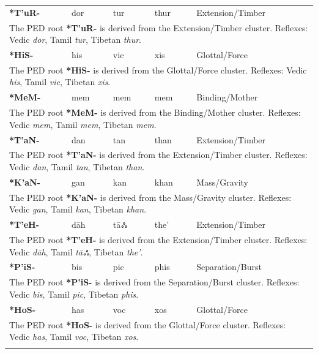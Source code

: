 \begin{longtable}{p{} p{} p{} p{} p{}}
\textbf{*T'uR-} & dor & tur & thur & Extension/Timber \\ 
\multicolumn{5}{p{\textwidth}}{\small The PED root \textbf{*T'uR-} is derived from the Extension/Timber cluster. Reflexes: Vedic \textit{dor}, Tamil \textit{tur}, Tibetan \textit{thur}. } \\ \addlinespace 
\textbf{*HiS-} & his & vic & xis & Glottal/Force \\ 
\multicolumn{5}{p{\textwidth}}{\small The PED root \textbf{*HiS-} is derived from the Glottal/Force cluster. Reflexes: Vedic \textit{his}, Tamil \textit{vic}, Tibetan \textit{xis}. } \\ \addlinespace 
\textbf{*MeM-} & mem & mem & mem & Binding/Mother \\ 
\multicolumn{5}{p{\textwidth}}{\small The PED root \textbf{*MeM-} is derived from the Binding/Mother cluster. Reflexes: Vedic \textit{mem}, Tamil \textit{mem}, Tibetan \textit{mem}. } \\ \addlinespace 
\textbf{*T'aN-} & dan & tan & than & Extension/Timber \\ 
\multicolumn{5}{p{\textwidth}}{\small The PED root \textbf{*T'aN-} is derived from the Extension/Timber cluster. Reflexes: Vedic \textit{dan}, Tamil \textit{tan}, Tibetan \textit{than}. } \\ \addlinespace 
\textbf{*K'aN-} & gan & kan & khan & Mass/Gravity \\ 
\multicolumn{5}{p{\textwidth}}{\small The PED root \textbf{*K'aN-} is derived from the Mass/Gravity cluster. Reflexes: Vedic \textit{gan}, Tamil \textit{kan}, Tibetan \textit{khan}. } \\ \addlinespace 
\textbf{*T'eH-} & dāh & tāஃ & the' & Extension/Timber \\ 
\multicolumn{5}{p{\textwidth}}{\small The PED root \textbf{*T'eH-} is derived from the Extension/Timber cluster. Reflexes: Vedic \textit{dāh}, Tamil \textit{tāஃ}, Tibetan \textit{the'}. } \\ \addlinespace 
\textbf{*P'iS-} & bis & pic & phis & Separation/Burst \\ 
\multicolumn{5}{p{\textwidth}}{\small The PED root \textbf{*P'iS-} is derived from the Separation/Burst cluster. Reflexes: Vedic \textit{bis}, Tamil \textit{pic}, Tibetan \textit{phis}. } \\ \addlinespace 
\textbf{*HoS-} & has & voc & xos & Glottal/Force \\ 
\multicolumn{5}{p{\textwidth}}{\small The PED root \textbf{*HoS-} is derived from the Glottal/Force cluster. Reflexes: Vedic \textit{has}, Tamil \textit{voc}, Tibetan \textit{xos}. } \\ \addlinespace 

\end{longtable}

